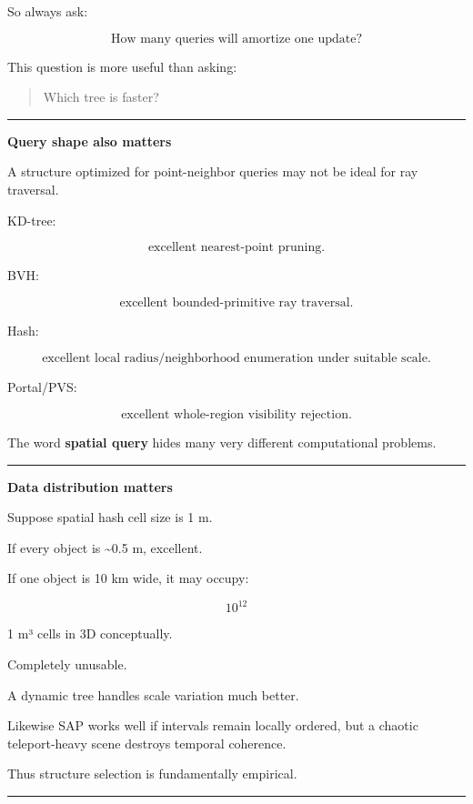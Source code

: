 So always ask:

\[
\boxed{
\text{How many queries will amortize one update?}
}
\]

This question is more useful than asking:

\begin{quote}
Which tree is faster?
\end{quote}

\begin{center}\rule{0.5\linewidth}{0.5pt}\end{center}

\textbf{Query shape also matters}

A structure optimized for point-neighbor queries may not be ideal for ray traversal.

KD-tree:

\[
\text{excellent nearest-point pruning}.
\]

BVH:

\[
\text{excellent bounded-primitive ray traversal}.
\]

Hash:

\[
\text{excellent local radius/neighborhood enumeration under suitable scale}.
\]

Portal/PVS:

\[
\text{excellent whole-region visibility rejection}.
\]

The word \textbf{spatial query} hides many very different computational problems.

\begin{center}\rule{0.5\linewidth}{0.5pt}\end{center}

\textbf{Data distribution matters}

Suppose spatial hash cell size is 1 m.

If every object is \textasciitilde0.5 m, excellent.

If one object is 10 km wide, it may occupy:

\[
10^{12}
\]

1 m³ cells in 3D conceptually.

Completely unusable.

A dynamic tree handles scale variation much better.

Likewise SAP works well if intervals remain locally ordered, but a chaotic teleport-heavy scene destroys temporal coherence.

Thus structure selection is fundamentally empirical.

\begin{center}\rule{0.5\linewidth}{0.5pt}\end{center}

